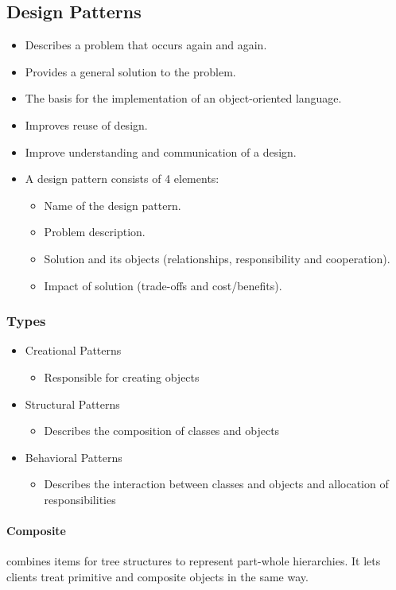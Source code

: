 \subsection{Design Patterns}
\begin{itemize}
	\item Describes a problem that occurs again and	again.
	\item Provides a general solution to the problem.
	\item The basis for the implementation of an object-oriented language.
	\item Improves reuse of design.
	\item Improve understanding and communication of a design.
	\item A design pattern consists of 4 elements:
	\begin{itemize}
		\item Name of the design pattern.
		\item Problem description.
		\item Solution and its objects (relationships, responsibility and cooperation).
		\item Impact of solution (trade-offs and cost/benefits).
	\end{itemize}
\end{itemize}

\subsubsection{Types}
\begin{itemize}
	\item Creational Patterns
	\begin{itemize}
		\item Responsible for creating objects
	\end{itemize} 
	\item Structural Patterns
	\begin{itemize}
		\item Describes the composition of classes and objects
	\end{itemize}
	\item Behavioral Patterns
	\begin{itemize}
		\item Describes the interaction between classes and objects
		and allocation of responsibilities
	\end{itemize}
\end{itemize}

\paragraph{Composite} combines items for tree structures to represent part-whole hierarchies. It lets clients treat primitive and composite objects in the same way.\\

